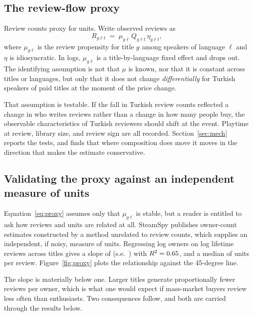 \documentclass[11pt]{article}
\begin{document}
\subsection{The review-flow proxy}\label{sec:proxy}

Review counts proxy for units. Write observed reviews as
\begin{equation}
R_{g\ell t} \;=\; \mu_{g\ell}\, Q_{g\ell t}\, \eta_{g\ell t},
\label{eq:proxy}
\end{equation}
where $\mu_{g\ell}$ is the review propensity for title $g$ among speakers of language $\ell$ and
$\eta$ is idiosyncratic. In logs, $\mu_{g\ell}$ is a title-by-language fixed effect and drops out.
The identifying assumption is not that $\mu$ is known, nor that it is constant across titles or
languages, but only that it does not change \emph{differentially} for Turkish speakers of paid
titles at the moment of the price change.

That assumption is testable. If the fall in Turkish review counts reflected a change in who writes
reviews rather than a change in how many people buy, the observable characteristics of Turkish
reviewers should shift at the event. Playtime at review, library size, and review sign are all
recorded. Section~\ref{sec:mech} reports the tests, and finds that where composition does move it
moves in the direction that makes the estimate conservative.

\subsection{Validating the proxy against an independent measure of units}\label{sec:validate}

Equation~\eqref{eq:proxy} assumes only that $\mu_{g\ell}$ is stable, but a reader is entitled to
ask how reviews and units are related at all. SteamSpy publishes owner-count estimates constructed
by a method unrelated to review counts, which supplies an independent, if noisy, measure of units.
Regressing log owners on log lifetime reviews across \proxyN{} titles gives a slope of
\proxySlope{} (s.e.\ \proxySE) with $R^2 = 0.65$, and a median of \multMed{} units per
review. Figure~\ref{fig:proxy} plots the relationship against the 45-degree line.

The slope is materially below one. Larger titles generate proportionally fewer reviews per owner,
which is what one would expect if mass-market buyers review less often than enthusiasts. Two
consequences follow, and both are carried through the results below.
\end{document}
